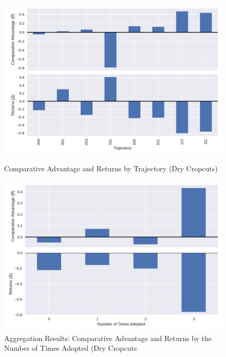\documentclass{article}
\begin{document}
\begin{figure}
    \centering
    \caption{Comparative Advantage and Returns by Trajectory (Dry Cropcuts)}
    \includegraphics[scale=0.75]{results/figures/theta.png}\label{fig:theta_delta_raw}
\end{figure}

\begin{figure}
    \centering
    \includegraphics[scale=0.75]{results/figures/traj_sum.png}
    \caption{Aggregation Results: Comparative Advantage and Returns by the Number of Times Adopted (Dry Cropcuts}
    \label{fig:traj_sum}
\end{figure}
\end{document}
